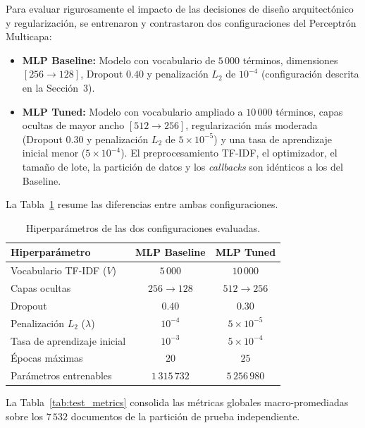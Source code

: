 \documentclass[12pt, a4paper]{article}
\begin{document}
Para evaluar rigurosamente el impacto de las decisiones de diseño arquitectónico y regularización, se entrenaron y contrastaron dos configuraciones del Perceptrón Multicapa:
\begin{itemize}
    \item \textbf{MLP Baseline:} Modelo con vocabulario de $5\,000$ términos, dimensiones $[256 \to 128]$, Dropout $0.40$ y penalización $L_2$ de $10^{-4}$ (configuración descrita en la Sección~3).
    \item \textbf{MLP Tuned:} Modelo con vocabulario ampliado a $10\,000$ términos, capas ocultas de mayor ancho $[512 \to 256]$, regularización más moderada (Dropout $0.30$ y penalización $L_2$ de $5 \times 10^{-5}$) y una tasa de aprendizaje inicial menor ($5 \times 10^{-4}$). El preprocesamiento TF-IDF, el optimizador, el tamaño de lote, la partición de datos y los \textit{callbacks} son idénticos a los del Baseline.
\end{itemize}

La Tabla~\ref{tab:hyperparams} resume las diferencias entre ambas configuraciones.

\begin{table}[H]
    \centering
    \caption{Hiperparámetros de las dos configuraciones evaluadas.}
    \label{tab:hyperparams}
    \begin{tabular}{@{}lcc@{}}
        \toprule
        \textbf{Hiperparámetro} & \textbf{MLP Baseline} & \textbf{MLP Tuned} \\
        \midrule
        Vocabulario TF-IDF ($V$)        & $5\,000$             & $10\,000$ \\
        Capas ocultas                   & $256 \to 128$        & $512 \to 256$ \\
        Dropout                         & $0.40$               & $0.30$ \\
        Penalización $L_2$ ($\lambda$)  & $10^{-4}$            & $5 \times 10^{-5}$ \\
        Tasa de aprendizaje inicial     & $10^{-3}$            & $5 \times 10^{-4}$ \\
        Épocas máximas                  & $20$                 & $25$ \\
        Parámetros entrenables          & $1\,315\,732$        & $5\,256\,980$ \\
        \bottomrule
    \end{tabular}
\end{table}

La Tabla~\ref{tab:test_metrics} consolida las métricas globales macro-promediadas sobre los $7\,532$ documentos de la partición de prueba independiente.
\end{document}
